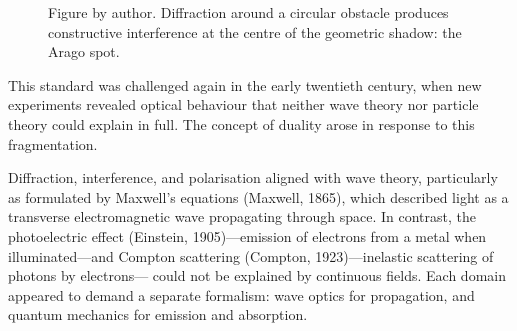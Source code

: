 \begin{figure}[h]
\centering
{}
\caption[Diffraction around a circular obstacle]{\centering\footnotesize Figure by author. Diffraction around a circular obstacle produces constructive interference at the centre of the geometric shadow: the Arago spot.}
\end{figure}

This standard was challenged again in the early twentieth century, when new experiments revealed optical behaviour that neither wave theory nor particle theory could explain in full. The concept of duality arose in response to this fragmentation.

Diffraction, interference, and polarisation aligned with wave theory, particularly as formulated by Maxwell's equations (Maxwell, 1865), which described light as a transverse electromagnetic wave propagating through space. In contrast, the photoelectric effect (Einstein, 1905)—emission of electrons from a metal when illuminated—and Compton scattering (Compton, 1923)—inelastic scattering of photons by electrons— could not be explained by continuous fields. Each domain appeared to demand a separate formalism: wave optics for propagation, and quantum mechanics for emission and absorption.

